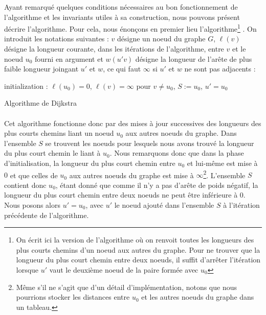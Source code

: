 
Ayant remarqué quelques conditions nécessaires au bon fonctionnement de l'algorithme et les invariants utiles à sa construction, nous pouvons  présent décrire l'algorithme.
Pour cela, nous énonçons en premier lieu l'algorithme\footnote{On écrit ici la version de l'algorithme où on renvoit toutes les longueurs des plus courts chemins d'un noeud aux autres du graphe.
Pour ne trouver que la longueur du plus court chemin entre deux noeuds, il suffit d'arrêter l'itération lorsque $u'$ vaut le deuxième noeud de la paire formée avec $u_0$} \cite{cours_graphe}.
On introduit les notations suivantes : $v$ désigne un noeud du graphe $G$, $\ell(v)$ désigne la longueur courante, dans les itérations de l'algorithme, entre $v$ et le noeud $u_0$ fourni en argument et $w(u'v)$ désigne la longueur de l'arête de plus faible longueur joingant $u'$ et $w$, ce qui faut $\infty$ si $u'$ et $w$ ne sont pas adjacents  :

\begin{algorithm}[H]
 initialization : $\ell(u_0)=0$, $\ell(v)=\infty$ pour $v \neq u_0$, $S:=u_0$, $u'=u_0$ \;
 \caption{Algorithme de Dijkstra}
 \label{algo:dijkstra}
\end{algorithm}

\paragraph{}

Cet algorithme fonctionne donc par des mises à jour successives des longueurs des plus courts chemins liant un noeud $u_0$ aux autres noeuds du graphe.
Dans l'ensemble $S$ se trouvent les noeuds pour lesquels nous avons trouvé la longueur du plus court chemin le liant à $u_0$.
Nous remarquons donc que dans la phase d'initialisation, la longueur du plus court chemin entre $u_0$ et lui-même est mise à $0$ et que celles de $u_0$ aux autres noeuds du graphe est mise à $\infty$\footnote{Même s'il ne s'agit que d'un détail d'implémentation, notons que nous pourrions stocker les distances entre $u_0$ et les autres noeuds du graphe dans un tableau.}.
L'ensemble $S$ contient donc $u_0$, étant donné que comme il n'y a pas d'arête de poids négatif, la longueur du plus court chemin entre deux noeuds ne peut être inférieure à $0$.
Nous posons alors $u'=u_0$, avec $u'$ le noeud ajouté dans l'ensemble $S$ à l'itération précédente de l'algorithme.

